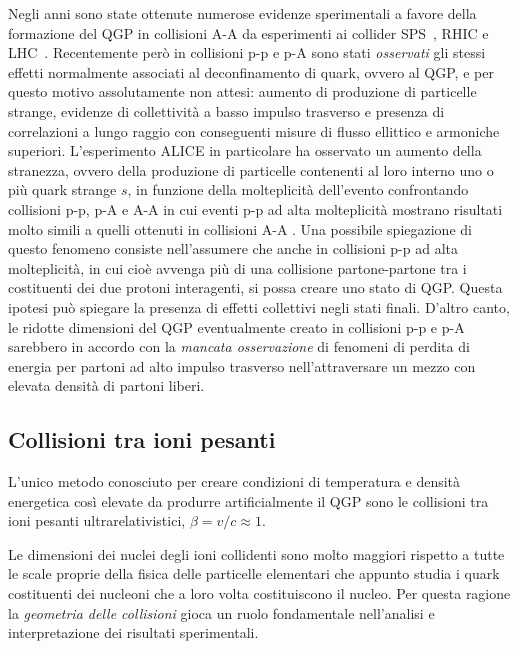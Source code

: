     Negli anni sono state ottenute numerose evidenze sperimentali a favore della formazione del QGP in collisioni A-A da esperimenti ai collider SPS~\cite{NA60_2021}, RHIC e LHC~\cite{ALICE_2024}. Recentemente però in collisioni p-p e p-A sono stati \textit{osservati} gli stessi effetti normalmente associati al deconfinamento di quark, ovvero al QGP, e per questo motivo assolutamente non attesi: aumento di produzione di particelle strange, evidenze di collettività a basso impulso trasverso e presenza di correlazioni a lungo raggio con conseguenti misure di flusso ellittico e armoniche superiori. L'esperimento ALICE in particolare ha osservato un aumento della stranezza, ovvero della produzione di particelle contenenti al loro interno uno o più quark strange $s$, in funzione della molteplicità dell'evento \cite{ALICE_2008} confrontando collisioni p-p, p-A e A-A in cui eventi p-p ad alta molteplicità mostrano risultati molto simili a quelli ottenuti in collisioni A-A \cite{RHIC_2020} \cite{ALICE_2017_pp} \cite{ALICE_2024_pp_pPb_PbPb}. Una possibile spiegazione di questo fenomeno consiste nell'assumere che anche in collisioni p-p ad alta molteplicità, in cui cioè avvenga più di una collisione partone-partone tra i costituenti dei due protoni interagenti, si possa creare uno stato di QGP. Questa ipotesi può spiegare la presenza di effetti collettivi negli stati finali. D'altro canto, le ridotte dimensioni del QGP eventualmente creato in collisioni p-p e p-A sarebbero in accordo con la \textit{mancata osservazione} di fenomeni di perdita di energia per partoni ad alto impulso trasverso nell'attraversare un mezzo con elevata densità di partoni liberi.

    \subsection{Collisioni tra ioni pesanti}
        L'unico metodo conosciuto per creare condizioni di temperatura e densità energetica così elevate da produrre artificialmente il QGP sono le collisioni tra ioni pesanti ultrarelativistici, $\beta = v/c \approx 1$.

        Le dimensioni dei nuclei degli ioni collidenti sono molto maggiori rispetto a tutte le scale proprie della fisica delle particelle elementari che appunto studia i quark costituenti dei nucleoni che a loro volta costituiscono il nucleo. Per questa ragione la \textit{geometria delle collisioni} gioca un ruolo fondamentale nell'analisi e interpretazione dei risultati sperimentali.

